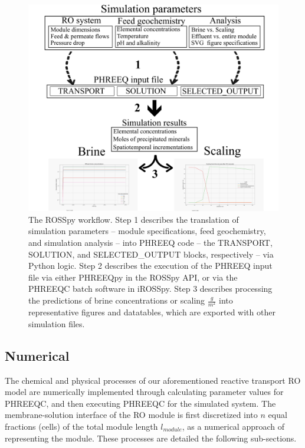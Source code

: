 \begin{figure}[t]
    \centering
    \includegraphics[width = \linewidth]{images/ROSSpy/rosspy_workflow_1.PNG}
    \caption{
        The ROSSpy workflow. Step 1 describes the translation of simulation parameters -- module specifications, feed geochemistry, and simulation analysis -- into PHREEQ code -- the TRANSPORT, SOLUTION, and SELECTED\_OUTPUT blocks, respectively --  via Python logic. Step 2 describes the execution of the PHREEQ input file via either PHREEQpy in the ROSSpy API, or via the PHREEQC batch software in iROSSpy. Step 3 describes processing the predictions of brine concentrations or scaling $\frac{g}{m^2}$ into representative figures and datatables, which are exported with other simulation files.
    }
    \label{workflow}
\end{figure}


\subsection{Numerical}
The chemical and physical processes of our aforementioned reactive transport RO model are numerically implemented through calculating parameter values for PHREEQC, and then executing PHREEQC for the simulated system. The membrane-solution interface of the RO module is first discretized into $n$ equal fractions (cells) of the total module length $l_{module}$, as a numerical approach of representing the module. These processes are detailed the following sub-sections. 

